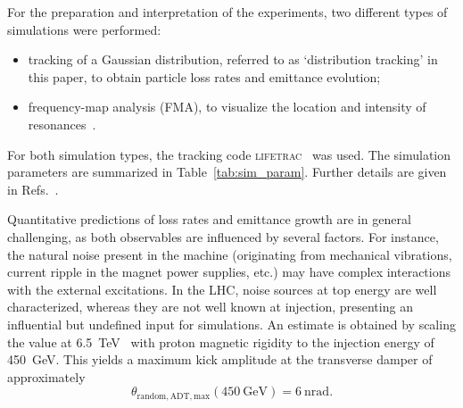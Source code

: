 \documentclass[aps
,prstab
,reprint
,longbibliography
,preprintnumbers
,showkeys
,amsfonts,amssymb,amsmath
,floatfix
]{revtex4-1}
\newcommand{\q}[2]{\ensuremath{#1\ \mathrm{#2}}} %
\newcommand{\code}[1]{\textsc{#1}} %
\begin{document}
\begin{table}
\begin{ruledtabular}
  \end{ruledtabular}
\end{table}

For the preparation and interpretation of the experiments, two
different types of simulations were performed:
%
\begin{itemize}
\item tracking of a Gaussian distribution, referred to as
  `distribution tracking' in this paper, to obtain particle loss rates
  and emittance evolution;
\item frequency-map analysis (FMA), to visualize the location and
  intensity of resonances~\cite{fmalaskar}.
\end{itemize}
%
For both simulation types, the tracking code
\code{lifetrac}~\cite{lifetrac} was used. The simulation parameters
are summarized in Table~\ref{tab:sim_param}. Further details are given
in Refs.~\cite{md_sim_hel_res_ex_fitterer, resexmd2017}.

Quantitative predictions of loss rates and emittance growth are in
general challenging, as both observables are influenced by several
factors. For instance, the natural noise present in the machine
(originating from mechanical vibrations, current ripple in the magnet
power supplies, etc.) may have complex interactions with the external
excitations. In the LHC, noise sources at top energy are well
characterized, whereas they are not well known at injection,
presenting an influential but undefined input for simulations.  An
estimate is obtained by scaling the value at
6.5~TeV~\cite{md1433_noise_top_energy, md_noise_bbLHC} with proton
magnetic rigidity to the injection energy of 450~GeV. This yields a
maximum kick amplitude at the transverse damper of approximately
%
\begin{equation}
  \label{eq:noise-kick}
  \theta_{\mathrm{random,ADT,max}}(\mathrm{450~GeV}) = \q{6}{nrad}.
\end{equation}
\end{document}
